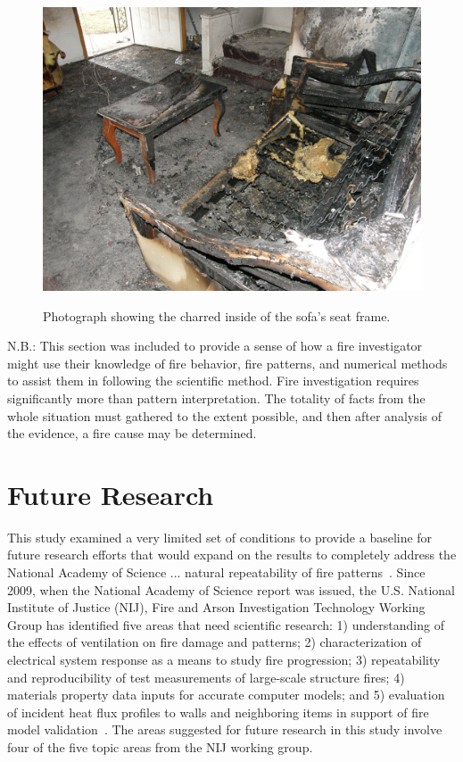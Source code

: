 \documentclass[twoside]{uocthesis}
\begin{document}
{\begin{figure}[h]
	\includegraphics[width=5in]{../Figures/Table} \\
	\caption[Photograph showing the charred inside of the sofa's seat frame.]{Photograph showing the charred inside of the sofa's seat frame.}
	\label{Table}
\end{figure}

N.B.: This section was included to provide a sense of how a fire investigator might use their knowledge of fire behavior, fire patterns, and numerical methods to assist them in following the scientific method.  Fire investigation requires significantly more than pattern interpretation.  The totality of facts from the whole situation must gathered to the extent possible, and then after analysis of the evidence, a fire cause may be determined. 

\chapter{Future Research}

This study examined a very limited set of conditions to provide a baseline for future research efforts that would expand on the results to completely address the National Academy of Science ...   natural repeatability of fire patterns~\cite{Forensic:2009}.   Since 2009, when the National Academy of Science report was issued, the U.S. National Institute of Justice (NIJ), Fire and Arson Investigation Technology Working Group has identified five areas that need scientific research: 1) understanding of the effects of ventilation on fire damage and patterns; 2) characterization of electrical system response as a means to study fire progression; 3) repeatability and reproducibility of test measurements of large-scale structure fires; 4) materials property data inputs for accurate computer models; and 5) evaluation of incident heat flux profiles to walls and neighboring items in support of fire model validation~\cite{NIJ:2016}.  The areas suggested for future research in this study involve four of the five topic areas from the NIJ working group.   

}
\end{document}
